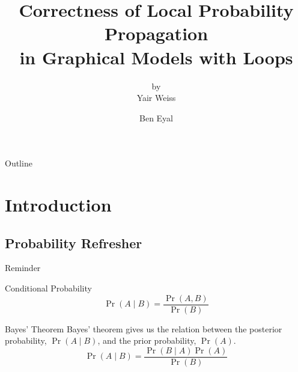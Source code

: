 \documentclass[handout]{beamer}
\title[]{Correctness of Local Probability Propagation\\in Graphical Models with Loops}
\subtitle{by\\Yair Weiss}
\author{Ben Eyal}
\begin{document}
\begin{frame}
    \titlepage
\end{frame}

\begin{frame}{Outline}
    \tableofcontents
\end{frame}

\section{Introduction}
\subsection{Probability Refresher}
\begin{frame}{Reminder}
    \begin{block}{Conditional Probability}
        \[ \Pr \left( A \mid B \right) = \frac{\Pr \left( A, B \right)}{\Pr \left( B \right)} \]
    \end{block}
    \begin{block}{Bayes' Theorem}
        Bayes' theorem gives us the relation between the posterior probability, $ \Pr \left( A \mid B \right) $, and the prior probability, $ \Pr \left( A \right) $.
        \[ \Pr \left( A \mid B \right) = \frac{\Pr \left( B \mid A \right) \Pr \left( A \right)}{\Pr \left( B \right)} \]
    \end{block}
\end{frame}
\end{document}
